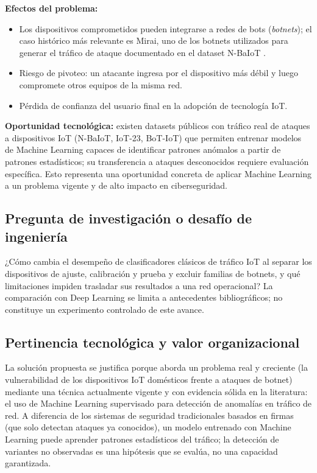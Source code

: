 \documentclass[11pt,a4paper]{article}
\begin{document}
\textbf{Efectos del problema:}
\begin{itemize}
    \item Los dispositivos comprometidos pueden integrarse a redes de bots (\textit{botnets}); el caso histórico más relevante es Mirai, uno de los botnets utilizados para generar el tráfico de ataque documentado en el dataset N-BaIoT \cite{meidan2018}.
    \item Riesgo de pivoteo: un atacante ingresa por el dispositivo más débil y luego compromete otros equipos de la misma red.
    \item Pérdida de confianza del usuario final en la adopción de tecnología IoT.
\end{itemize}

\textbf{Oportunidad tecnológica:} existen datasets públicos con tráfico real de ataques a dispositivos IoT (N-BaIoT, IoT-23, BoT-IoT) que permiten entrenar modelos de Machine Learning capaces de identificar patrones anómalos a partir de patrones estadísticos; su transferencia a ataques desconocidos requiere evaluación específica. Esto representa una oportunidad concreta de aplicar Machine Learning a un problema vigente y de alto impacto en ciberseguridad.

\subsection{Pregunta de investigación o desafío de ingeniería}
¿Cómo cambia el desempeño de clasificadores clásicos de tráfico IoT al separar los dispositivos de ajuste, calibración y prueba y excluir familias de botnets, y qué limitaciones impiden trasladar sus resultados a una red operacional? La comparación con Deep Learning se limita a antecedentes bibliográficos; no constituye un experimento controlado de este avance.

\subsection{Pertinencia tecnológica y valor organizacional}
La solución propuesta se justifica porque aborda un problema real y creciente (la vulnerabilidad de los dispositivos IoT domésticos frente a ataques de botnet) mediante una técnica actualmente vigente y con evidencia sólida en la literatura: el uso de Machine Learning supervisado para detección de anomalías en tráfico de red. A diferencia de los sistemas de seguridad tradicionales basados en firmas (que solo detectan ataques ya conocidos), un modelo entrenado con Machine Learning puede aprender patrones estadísticos del tráfico; la detección de variantes no observadas es una hipótesis que se evalúa, no una capacidad garantizada.
\end{document}
